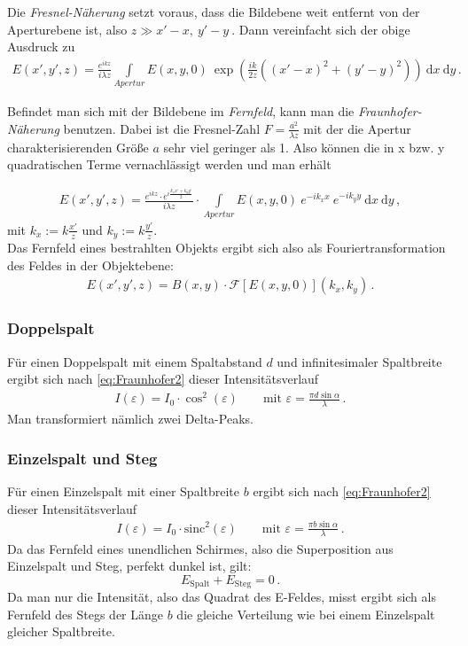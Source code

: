 \documentclass[12pt,a4paper,titlepage,headinclude,bibtotoc]{scrartcl}
\newcommand{\dif}{\ensuremath{\mathrm{d}}}
\newcommand{\sinc}{\ensuremath{\mathrm{sinc}}}
\begin{document}
Die \emph{Fresnel-Näherung} setzt voraus, dass die Bildebene weit entfernt von der Aperturebene ist, also $z \gg x'-x,~y'-y~$.
Dann vereinfacht sich der obige Ausdruck zu
\begin{align}
	E(x',y',z)=\frac{e^{ikz}}{i \lambda z} \int \limits _{Apertur} E(x,y,0) ~ \exp\left(\frac{ik}{2z}\left((x'-x)^2+(y'-y)^2\right)\right) ~\dif x ~\dif y\,.
	\label{eq:Fresnel}
\end{align}

Befindet man sich mit der Bildebene im \emph{Fernfeld}, kann man die \emph{Fraunhofer-Näherung} benutzen.
Dabei ist die Fresnel-Zahl $F=\frac{a^2}{\lambda z}$ mit der die Apertur charakterisierenden Größe $a$ sehr viel geringer als 1.
Also können die in x bzw. y quadratischen Terme vernachlässigt werden und man erhält

\begin{align}
	E(x',y',z)=\frac{e^{ikz} \cdot e^{i \frac{k_xx'+k_yy'}{2}}}{i \lambda z}\cdot \int \limits _{Apertur} E(x,y,0)~ e^{-ik_xx} ~ e^{-ik_yy} ~\dif x~ \dif y \,,
	\label{eq:Fraunhofer1}
\end{align}
mit $k_x:= k\frac{x'}{z}$ und  $k_y:= k\frac{y'}{z}$.\\

Das Fernfeld eines bestrahlten Objekts ergibt sich also als Fouriertransformation des Feldes in der Objektebene:
\begin{align}
	E(x',y',z)=B(x,y)\cdot \mathcal{F}\left[E(x,y,0)
	\right](k_x,k_y) \,.
	\label{eq:Fraunhofer2}
\end{align}

\subsubsection{Doppelspalt}
Für einen Doppelspalt mit einem Spaltabstand $d$ und infinitesimaler Spaltbreite ergibt sich nach \eqref{eq:Fraunhofer2} dieser Intensitätsverlauf
\begin{align}
	I(\varepsilon)=I_0 \cdot \cos^2(\varepsilon) \qquad \text{mit }\varepsilon= \frac{\pi d \sin \alpha}{\lambda}\,.
\end{align}
Man transformiert nämlich zwei Delta-Peaks.

\subsubsection{Einzelspalt und Steg}
Für einen Einzelspalt mit einer Spaltbreite $b$ ergibt sich nach \eqref{eq:Fraunhofer2} dieser Intensitätsverlauf
\begin{align}
	I(\varepsilon)=I_0 \cdot \sinc^2(\varepsilon)\qquad \text{mit }\varepsilon= \frac{\pi b \sin \alpha}{\lambda}\,.
\end{align}
Da das Fernfeld eines unendlichen Schirmes, also die Superposition aus Einzelspalt und Steg, perfekt dunkel ist, gilt:
$$ E_\text{Spalt} + E_\text{Steg} = 0 \,.$$
Da man nur die Intensität, also das Quadrat des E-Feldes, misst ergibt sich als Fernfeld des Stegs der Länge $b$ die gleiche Verteilung wie bei einem Einzelspalt gleicher Spaltbreite.
\end{document}
